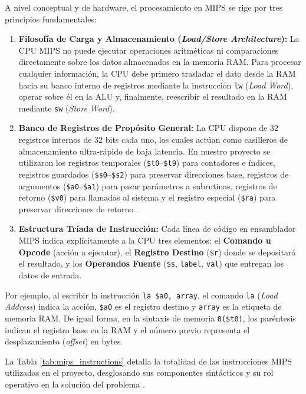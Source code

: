 \documentclass[12pt,a4paper]{article}
\begin{document}
A nivel conceptual y de hardware, el procesamiento en MIPS se rige por tres principios fundamentales:

\begin{enumerate}[leftmargin=*]
    \item \textbf{Filosofía de Carga y Almacenamiento (\textit{Load/Store Architecture}):} La CPU MIPS no puede ejecutar operaciones aritméticas ni comparaciones directamente sobre los datos almacenados en la memoria RAM. Para procesar cualquier información, la CPU debe primero trasladar el dato desde la RAM hacia su banco interno de registros mediante la instrucción \texttt{lw} (\textit{Load Word}), operar sobre él en la ALU y, finalmente, reescribir el resultado en la RAM mediante \texttt{sw} (\textit{Store Word}).
    
    \item \textbf{Banco de Registros de Propósito General:} La CPU dispone de 32 registros internos de 32 bits cada uno, los cuales actúan como casilleros de almacenamiento ultra-rápido de baja latencia. En nuestro proyecto se utilizaron los registros temporales (\texttt{\$t0}--\texttt{\$t9}) para contadores e índices, registros guardados (\texttt{\$s0}--\texttt{\$s2}) para preservar direcciones base, registros de argumentos (\texttt{\$a0}--\texttt{\$a1}) para pasar parámetros a subrutinas, registros de retorno (\texttt{\$v0}) para llamadas al sistema y el registro especial (\texttt{\$ra}) para preservar direcciones de retorno \cite{patterson, mars}.

    \item \textbf{Estructura Tríada de Instrucción:} Cada línea de código en ensamblador MIPS indica explícitamente a la CPU tres elementos: el \textbf{Comando u Opcode} (acción a ejecutar), el \textbf{Registro Destino} (\texttt{\$r}) donde se depositará el resultado, y los \textbf{Operandos Fuente} (\texttt{\$s}, \texttt{label}, \texttt{val}) que entregan los datos de entrada.
\end{enumerate}

Por ejemplo, al escribir la instrucción \texttt{la \$a0, array}, el comando \texttt{la} (\textit{Load Address}) indica la acción, \texttt{\$a0} es el registro destino y \texttt{array} es la etiqueta de memoria RAM. De igual forma, en la sintaxis de memoria \texttt{0(\$t0)}, los paréntesis indican el registro base en la RAM y el número previo representa el desplazamiento (\textit{offset}) en bytes.

La Tabla \ref{tab:mips_instructions} detalla la totalidad de las instrucciones MIPS utilizadas en el proyecto, desglosando sus componentes sintácticos y su rol operativo en la solución del problema \cite{patterson, mars}.
\end{document}
